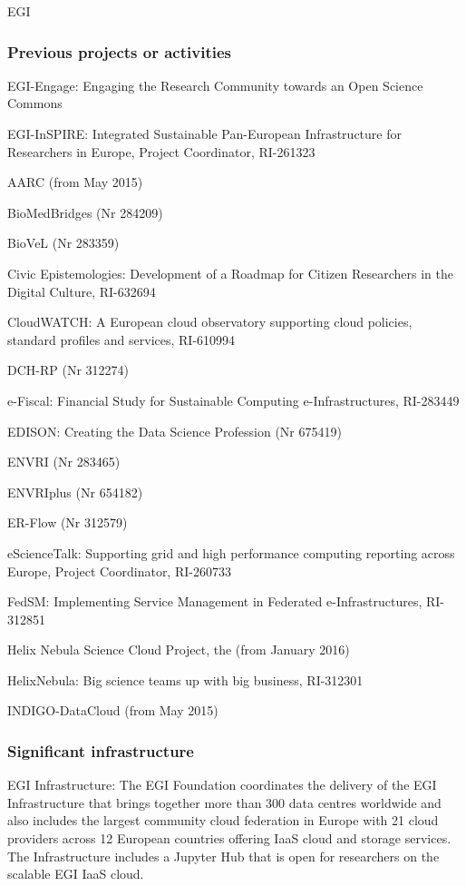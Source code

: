 \begin{sitedescription}{EGI}
\subsubsection*{Previous projects or activities}

\begin{compactenum}
\item EGI-Engage: Engaging the Research Community towards an Open Science Commons
\item EGI-InSPIRE: Integrated Sustainable Pan-European Infrastructure for Researchers in Europe, Project Coordinator, RI-261323
\item AARC (from May 2015)
\item BioMedBridges (Nr 284209)
\item BioVeL (Nr 283359)
\item Civic Epistemologies: Development of a Roadmap for Citizen Researchers in the Digital Culture, RI-632694
\item CloudWATCH: A European cloud observatory supporting cloud policies, standard profiles and services, RI-610994
\item DCH-RP (Nr 312274)
\item e-Fiscal: Financial Study for Sustainable Computing e-Infrastructures, RI-283449
\item EDISON: Creating the Data Science Profession (Nr 675419)
\item ENVRI (Nr 283465)
\item ENVRIplus (Nr 654182)
\item ER-Flow (Nr 312579)
\item eScienceTalk: Supporting grid and high performance computing reporting across Europe, Project Coordinator, RI-260733
\item FedSM: Implementing Service Management in Federated e-Infrastructures, RI-312851
\item Helix Nebula Science Cloud Project, the (from January 2016)
\item HelixNebula: Big science teams up with big business, RI-312301
\item INDIGO-DataCloud (from May 2015)
\end{compactenum}

\subsubsection*{Significant infrastructure}

EGI Infrastructure: The EGI Foundation coordinates the delivery of the EGI Infrastructure that brings together more than 300 data centres worldwide and also includes the largest community cloud federation in Europe with 21 cloud providers across 12 European countries offering IaaS cloud and storage services. The Infrastructure includes a Jupyter Hub that is open for researchers on the scalable EGI IaaS cloud.

\end{sitedescription}
